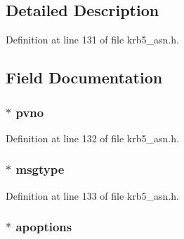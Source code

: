 \subsection{Detailed Description}


Definition at line 131 of file krb5\+\_\+asn.\+h.



\subsection{Field Documentation}
\subsubsection[{\texorpdfstring{pvno}{pvno}}]{ $\ast$ pvno}\hypertarget{structkrb5__ap__req__st_a5c73dcaf31ec0dfedb5137e383de258e}{}\label{structkrb5__ap__req__st_a5c73dcaf31ec0dfedb5137e383de258e}


Definition at line 132 of file krb5\+\_\+asn.\+h.

\subsubsection[{\texorpdfstring{msgtype}{msgtype}}]{ $\ast$ msgtype}\hypertarget{structkrb5__ap__req__st_a28f12d5a6aec5c9acc80d545cc5471c5}{}\label{structkrb5__ap__req__st_a28f12d5a6aec5c9acc80d545cc5471c5}


Definition at line 133 of file krb5\+\_\+asn.\+h.

\subsubsection[{\texorpdfstring{apoptions}{apoptions}}]{ $\ast$ apoptions}\hypertarget{structkrb5__ap__req__st_abe838e2d3723fdbd7743504db6fc420b}{}\label{structkrb5__ap__req__st_abe838e2d3723fdbd7743504db6fc420b}


